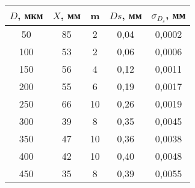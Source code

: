 \begin{table}[h!]
    \centering
    \begin{tabular}{|c|c|c|c|c|}
    \hline
    $D$, мкм  & $X$, мм  & m  & $Ds$, мм   & $\sigma_{D_s}$, мм   \\ \hline
    50        & 85       & 2  & 0,04       & 0,0002               \\ \hline
    100       & 53       & 2  & 0,06       & 0,0006               \\ \hline
    150       & 56       & 4  & 0,12       & 0,0011               \\ \hline
    200       & 55       & 6  & 0,19       & 0,0017               \\ \hline
    250       & 66       & 10 & 0,26       & 0,0019               \\ \hline
    300       & 39       & 8  & 0,35       & 0,0045               \\ \hline
    350       & 47       & 10 & 0,36       & 0,0038               \\ \hline
    400       & 42       & 10 & 0,40       & 0,0048               \\ \hline
    450       & 35       & 8  & 0,39       & 0,0055               \\ \hline
    \end{tabular}
    \caption{}
    \label{table:DsSpectr}
\end{table}